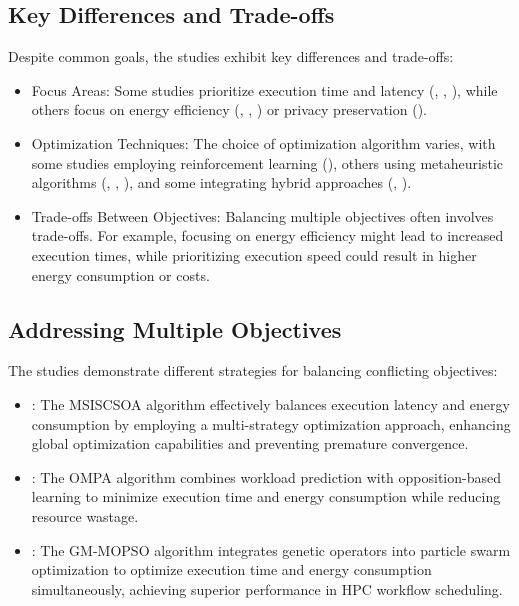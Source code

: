 \documentclass[a4paper, final]{article}
\begin{document}
\subsection{Key Differences and Trade-offs}
Despite common goals, the studies exhibit key differences and trade-offs:
\begin{itemize}
    \item Focus Areas: Some studies prioritize execution time and latency (\cite{bibib:1_acrl}, \cite{bib:3_sandcat}, 
    \cite{bib:4_faas}), while others focus on energy efficiency (\cite{bib:5_epee}, \cite{bib:6_marine}, \cite{bib:10}) 
    or privacy preservation (\cite{bib:7_ppps}).

    \item Optimization Techniques: The choice of optimization algorithm varies, with some studies employing 
    reinforcement learning (\cite{bib:1_acrl}), others using metaheuristic algorithms (\cite{bib:3_sandcat}, \cite{bib:6_marine}, 
    \cite{bib:10}), and some integrating hybrid approaches (\cite{bib:2_faro}, \cite{bib:9}).
    
    \item Trade-offs Between Objectives: Balancing multiple objectives often involves trade-offs. For example, 
    focusing on energy efficiency might lead to increased execution times, while prioritizing execution speed could 
    result in higher energy consumption or costs.
\end{itemize}

\subsection{Addressing Multiple Objectives}
The studies demonstrate different strategies for balancing conflicting objectives:
\begin{itemize}
    \item \cite{bib:3_sandcat}: The MSISCSOA algorithm effectively balances execution latency and energy consumption 
    by employing a multi-strategy optimization approach, enhancing global optimization capabilities and preventing 
    premature convergence.

    \item \cite{bib:6_marine}: The OMPA algorithm combines workload prediction with opposition-based learning to minimize 
    execution time and energy consumption while reducing resource wastage.
    
    \item \cite{bib:10}: The GM-MOPSO algorithm integrates genetic operators into particle swarm optimization to optimize 
    execution time and energy consumption simultaneously, achieving superior performance in HPC workflow scheduling.
\end{itemize}
\end{document}
